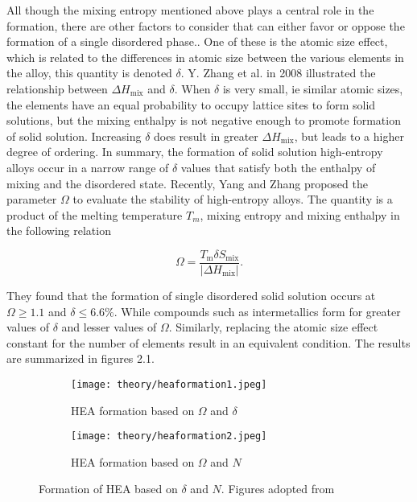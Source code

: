 All though the mixing entropy mentioned above plays a central role in the formation, there are other factors to consider that can either favor or oppose the formation of a single disordered phase.. One of these is the atomic size effect, which is related to the differences in atomic size between the various elements in the alloy, this quantity is denoted $\delta$. Y. Zhang et al. in 2008 illustrated the relationship between $\Delta H_\text{mix}$ and $\delta$. When $\delta$ is very small, ie similar atomic sizes, the elements have an equal probability to occupy lattice sites to form solid solutions, but the mixing enthalpy is not negative enough to promote formation of solid solution. Increasing $\delta$ does result in greater $\Delta H_\text{mix}$, but leads to a higher degree of ordering. In summary, the formation of solid solution high-entropy alloys occur in a narrow range of $\delta$ values that satisfy both the enthalpy of mixing and the disordered state. Recently, Yang and Zhang proposed the parameter $\Omega$ to evaluate the stability of high-entropy alloys. The quantity is a product of the melting temperature $T_m$, mixing entropy and mixing enthalpy in the following relation

\begin{equation}
\Omega = \frac{T_\text{m} \delta S_\text{mix}}{|\Delta H_\text{mix}|}.
\end{equation}

They found that the formation of single disordered solid solution occurs at $\Omega \geq 1.1$ and $\delta \leq 6.6\%$. While compounds such as intermetallics form for greater values of $\delta$ and lesser values of $\Omega$. Similarly, replacing the atomic size effect constant for the number of elements result in an equivalent condition. The results are summarized in figures 2.1.

\begin{figure} 
\centering
\begin{subfigure}{0.7\textwidth}
\texttt{[image: theory/heaformation1.jpeg]}
\caption{HEA formation based on $\Omega$ and $\delta$}
\end{subfigure}
\begin{subfigure}{0.7\textwidth}
\texttt{[image: theory/heaformation2.jpeg]}
\caption{HEA formation based on $\Omega$ and $N$}
\end{subfigure}
\caption{Formation of HEA based on $\delta$ and $N$. Figures adopted from \cite{hea2016_ch2}}
\label{Omega} 
\end{figure} 

